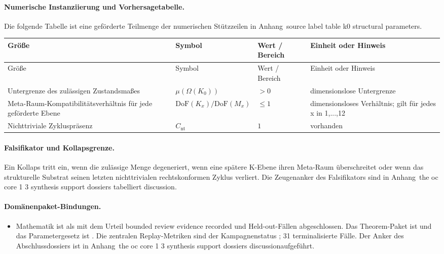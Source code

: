 \paragraph{Numerische Instanziierung und Vorhersagetabelle.}
Die folgende Tabelle ist eine geförderte Teilmenge der numerischen Stützzeilen in Anhang~source label table k0 structural parameters.
\begin{longtable}{@{}L{0.27\textwidth}L{0.15\textwidth}L{0.24\textwidth}L{0.16\textwidth}@{}}
\toprule
Größe & Symbol & Wert / Bereich & Einheit oder Hinweis \\
\midrule
\endfirsthead
\toprule
Größe & Symbol & Wert / Bereich & Einheit oder Hinweis \\
\midrule
\endhead
Untergrenze des zulässigen Zustandsmaßes & $\scriptstyle \mu(\Omega(K_0))$ & $> 0$ & dimensionslose Untergrenze \\
Meta-Raum-Kompatibilitätsverhältnis für jede geförderte Ebene & $\scriptstyle \mathrm{DoF}(K_x)/\allowbreak \mathrm{DoF}(M_x)$ & $\leq 1$ & dimensionsloses Verhältnis; gilt für jedes x in 1,...,12 \\
Nichttriviale Zykluspräsenz & $\scriptstyle C_{\mathrm{nt}}$ & $1$ & vorhanden \\
\bottomrule
\end{longtable}

\paragraph{Falsifikator und Kollapsgrenze.}
Ein Kollaps tritt ein, wenn die zulässige Menge degeneriert, wenn eine spätere K-Ebene ihren Meta-Raum überschreitet oder wenn das strukturelle Substrat seinen letzten nichttrivialen rechtskonformen Zyklus verliert.
Die Zeugenanker des Falsifikators sind in Anhang~the oc core 1 3 synthesis support dossiers tabelliert discussion.

\paragraph{Domänenpaket-Bindungen.}
\begin{itemize}[leftmargin=1.6em,nosep]
\item Mathematik ist als  mit dem Urteil bounded review evidence recorded und  Held-out-Fällen abgeschlossen. Das Theorem-Paket ist  und das Parametergesetz ist . Die zentralen Replay-Metriken sind der Kampagnenstatus ; 31 terminalisierte Fälle. Der Anker des Abschlussdossiers ist in Anhang~the oc core 1 3 synthesis support dossiers discussionaufgeführt.
\end{itemize}

